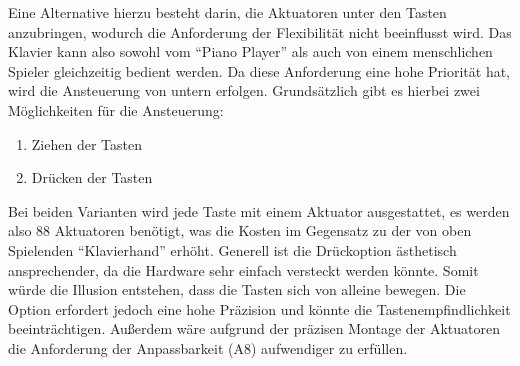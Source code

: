 Eine Alternative hierzu besteht darin, die Aktuatoren unter den Tasten anzubringen, wodurch die Anforderung der Flexibilität nicht beeinflusst wird.\newline
Das Klavier kann also sowohl vom \enquote{Piano Player} als auch von einem menschlichen Spieler gleichzeitig bedient werden.
Da diese Anforderung eine hohe Priorität hat, wird die Ansteuerung von untern erfolgen. \newline
Grundsätzlich gibt es hierbei zwei Möglichkeiten für die Ansteuerung:
\begin{enumerate}
	\item Ziehen der Tasten
	\item Drücken der Tasten
\end{enumerate}
Bei beiden Varianten wird jede Taste mit einem Aktuator
ausgestattet, es werden also 88 Aktuatoren benötigt, was die Kosten %
im Gegensatz zu der von oben Spielenden \enquote{Klavierhand}
erhöht.
Generell ist die Drückoption ästhetisch ansprechender, da die Hardware sehr einfach versteckt werden könnte.
Somit würde die Illusion entstehen, dass die Tasten sich von alleine bewegen. Die Option erfordert jedoch eine hohe Präzision und könnte die
Tastenempfindlichkeit beeinträchtigen. Außerdem wäre aufgrund der präzisen Montage der Aktuatoren die Anforderung
der Anpassbarkeit (A8) aufwendiger zu erfüllen.

